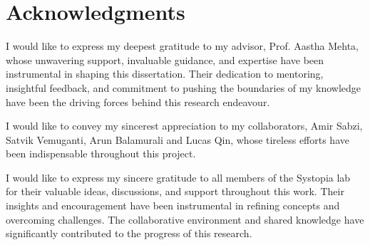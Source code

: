 
\chapter{Acknowledgments}

I would like to express my deepest gratitude to my advisor, Prof. Aastha Mehta, whose unwavering support, invaluable guidance, and expertise have been instrumental in shaping this dissertation.
Their dedication to mentoring, insightful feedback, and commitment to pushing the boundaries of my knowledge have been the driving forces behind this research endeavour. 

I would like to convey my sincerest appreciation to my collaborators, Amir Sabzi, Satvik Vemuganti, Arun Balamurali and Lucas Qin, whose tireless efforts have been indispensable throughout this project.

I would like to express my sincere gratitude to all members of the Systopia lab for their valuable ideas, discussions, and support throughout this work. Their insights and encouragement have been instrumental in refining concepts and overcoming challenges. The collaborative environment and shared knowledge have significantly contributed to the progress of this research.

\endinput

I extend my heartfelt gratitude to Prof. Margo Seltzer for her invaluable contributions as a committee member for this dissertation.
Her extensive knowledge and keen insights have greatly enriched the depth and quality of this work.